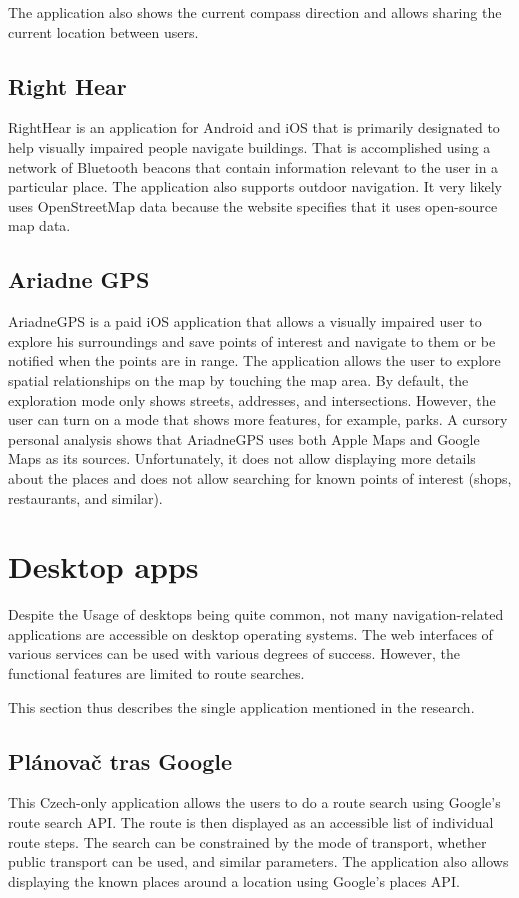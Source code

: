 \documentclass[nolof,digital]{fithesis3}
\begin{document}
The application also shows the current compass direction and allows sharing the current location between users.
\subsection{Right Hear}
RightHear \parencite{righthear} is an application for Android and iOS that is primarily designated to help visually impaired people navigate buildings. That is accomplished using a network of Bluetooth beacons that contain information relevant to the user in a particular place. The application also supports outdoor navigation. It very likely uses OpenStreetMap data because the website specifies that it uses open-source map data.
\subsection{Ariadne GPS}
AriadneGPS \parencite{ariadnegps} is a paid iOS application that allows a visually impaired user to explore his surroundings and save points of interest and navigate to them or be notified when the points are in range. The application allows the user to explore spatial relationships on the map by touching the map area. By default, the exploration mode only shows streets, addresses, and intersections. However, the user can turn on a mode that shows more features, for example, parks. A cursory personal analysis shows that AriadneGPS uses both Apple Maps and Google Maps as its sources. Unfortunately, it does not allow displaying more details about the places and does not allow searching for known points of interest (shops, restaurants, and similar).
\section{Desktop apps}
Despite the Usage of desktops being quite common, not many navigation-related applications are accessible on desktop operating systems. The web interfaces of various services can be used with various degrees of success. However, the functional features are limited to route searches.

This section thus describes the single application mentioned in the research.
\subsection{Plánovač tras Google}
This Czech-only application \parencite{ptg} allows the users to do a route search using Google's route search API. The route is then displayed as an accessible list of individual route steps. The search can be constrained by the mode of transport, whether public transport can be used, and similar parameters. The application also allows displaying the known places around a location using Google's places API.
\end{document}
